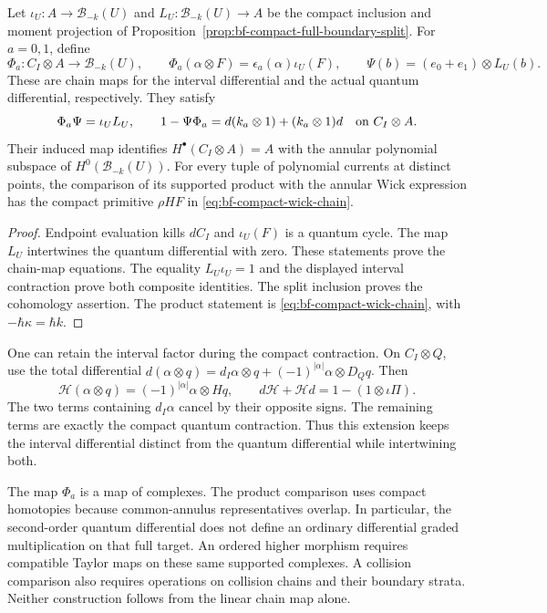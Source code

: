 \begin{proposition}
\label{prop:interval-supported-current-chain-map}
Let $\iota_U:A\to\mathcal B_{-k}(U)$ and
$L_U:\mathcal B_{-k}(U)\to A$ be the compact inclusion and moment
projection of Proposition~\ref{prop:bf-compact-full-boundary-split}.
For $a=0,1$, define
\[
 \Phi_a:C_I\otimes A\longrightarrow\mathcal B_{-k}(U),
 \qquad \Phi_a(\alpha\otimes F)=\epsilon_a(\alpha)\iota_U(F),
 \qquad
 \Psi(b)=(e_0+e_1)\otimes L_U(b).
\]
These are chain maps for the interval differential and the actual
quantum differential, respectively.  They satisfy
\[
 \Phi_a\Psi=\iota_UL_U,\qquad
 1-\Psi\Phi_a=d(k_a\otimes1)+(k_a\otimes1)d
               \quad\hbox{on }C_I\otimes A.
\]
Their induced map identifies $H^\bullet(C_I\otimes A)=A$ with
the annular polynomial subspace of $H^0(\mathcal B_{-k}(U))$.
For every tuple of polynomial currents at distinct points, the
comparison of its supported product with the annular Wick expression
has the compact primitive $\rho H F$ in
\eqref{eq:bf-compact-wick-chain}.
\end{proposition}
\begin{proof}
Endpoint evaluation kills $dC_I$ and $\iota_U(F)$ is a quantum cycle.
The map $L_U$ intertwines the quantum differential with zero.
These statements prove the chain-map equations.
The equality $L_U\iota_U=1$ and the displayed interval contraction
prove both composite identities.  The split inclusion proves the
cohomology assertion.  The product statement is
\eqref{eq:bf-compact-wick-chain}, with $-\hbar\kappa=\hbar k$.
\end{proof}

One can retain the interval factor during the compact contraction.
On $C_I\otimes Q$, use the total differential
$d(\alpha\otimes q)=d_I\alpha\otimes q+
(-1)^{|\alpha|}\alpha\otimes D_Qq$.  Then
\[
 \mathscr H(\alpha\otimes q)=(-1)^{|\alpha|}\alpha\otimes Hq,
 \qquad
 d\mathscr H+\mathscr Hd=1-(1\otimes\iota\Pi).
\]
The two terms containing $d_I\alpha$ cancel by their opposite signs.
The remaining terms are exactly the compact quantum contraction.
Thus this extension keeps the interval differential distinct from
the quantum differential while intertwining both.

The map $\Phi_a$ is a map of complexes.  The product comparison uses
compact homotopies because common-annulus representatives overlap.
In particular, the second-order quantum differential does not define
an ordinary differential graded multiplication on that full target.
An ordered higher morphism requires compatible Taylor maps on these
same supported complexes.  A collision comparison also requires
operations on collision chains and their boundary strata.
Neither construction follows from the linear chain map alone.

